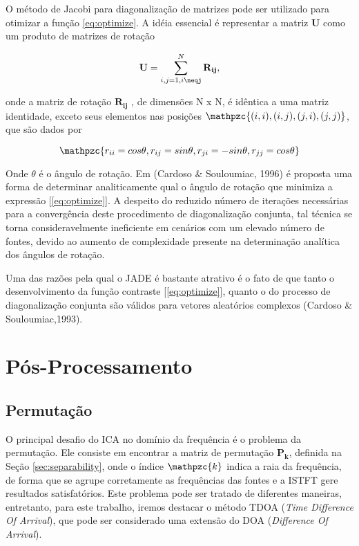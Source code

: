     O método de Jacobi para diagonalização de matrizes pode ser utilizado para otimizar a função \ref{eq:optimize}. A idéia essencial é representar a matriz $\mathbf{U}$ como um produto de matrizes de rotação
    
    \begin{equation}
        \mathbf{U} = \sum_{i,j=1,i\neqj}^N \mathbf{R_{ij}},
    \end{equation}
    
    onde a matriz de rotação $\mathbf{R_{ij}}$ , de dimensões N x N, é idêntica a uma matriz identidade, exceto seus elementos nas posições $\mathpzc{(i,i), (i,j), (j,i), (j,j)}$, que são dados por 
    
    \begin{equation}
        \mathpzc{r_{ii} = cos \theta, r_{ij} = sin \theta, r_{ji} = -sin \theta, r_{jj} = cos \theta}
    \end{equation}
    
    Onde $\theta$ é o ângulo de rotação. Em (Cardoso & Souloumiac, 1996) é proposta uma forma de determinar analiticamente qual o ângulo de rotação que minimiza a expressão [\ref{eq:optimize}]. A despeito do reduzido número de iterações necessárias para a convergência deste procedimento de diagonalização conjunta, tal técnica se torna consideravelmente ineficiente em cenários com um elevado número de fontes, devido ao aumento de complexidade presente na determinação analítica dos ângulos de rotação.
    
    Uma das razões pela qual o JADE é bastante atrativo é o fato de que tanto o desenvolvimento da função contraste [\ref{eq:optimize}], quanto o do processo de diagonalização conjunta são válidos para vetores aleatórios complexos (Cardoso & Souloumiac,1993). 
\section{Pós-Processamento}
    \subsection{Permutação}
    O principal desafio do ICA no domínio da frequência é o problema da permutação. Ele consiste em encontrar a matriz de permutação $\mathbf{P_k}$, definida na Seção \ref{sec:separability}, onde o índice $\mathpzc{k}$ indica a raia da frequência, de forma que se agrupe corretamente as frequências das fontes e a ISTFT gere resultados satisfatórios.
    Este problema pode ser tratado de diferentes maneiras, entretanto, para este trabalho, iremos destacar o método TDOA (\textit{Time Difference Of Arrival}), que pode ser considerado uma extensão do DOA (\textit{Difference Of Arrival}).
    
